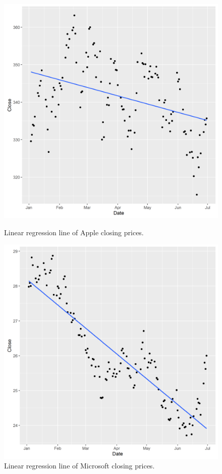 \documentclass[paper=a4, fontsize=11pt]{scrartcl} %
\numberwithin{equation}{section} %
\numberwithin{figure}{section} %
\numberwithin{table}{section} %
\begin{document}
\begin{figure}[!htb]
  \includegraphics[width=\linewidth]{graph/a_reg1.png}
  \caption{Linear regression line of Apple closing prices.}
\endminipage\hfill
{}
  \includegraphics[width=\linewidth]{graph/m_reg1.png}
  \caption{Linear regression line of Microsoft closing prices.}
\endminipage\hfill
\end{figure}
\end{document}

